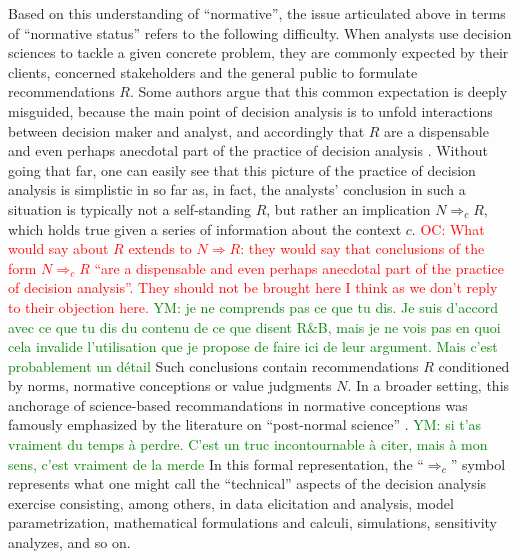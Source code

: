 \documentclass[preprint, french, english, 11pt, authoryear]{elsarticle}%
\newcommand{\commentYM}[1]{\textcolor{green}{YM: #1}}
\newcommand{\commentOC}[1]{\textcolor{red}{OC: #1}}
\newcommand{\commentOCf}[1]{\textcolor{red}{\selectlanguage{french}{OC : #1}}}
\begin{document}
Based on this understanding of “normative”, the issue articulated above in terms of “normative status” refers to the following difficulty. When analysts use decision sciences to tackle a given concrete problem, they are commonly expected by their clients, concerned stakeholders and the general public to formulate recommendations $R$. Some authors argue that this common expectation is deeply misguided, because the main point of decision analysis is to unfold interactions between decision maker and analyst, and accordingly that $R$ are a dispensable and even perhaps anecdotal part of the practice of decision analysis \citep{roy_aide_1993}. Without going that far, one can easily see that this picture of the practice of decision analysis is simplistic in so far as, in fact, the analysts' conclusion in such a situation is typically not a self-standing $R$, but rather an implication $N ⇒_c R$, which holds true given a series of information about the context $c$. 
\commentOC{What \citeauthor{roy_aide_1993} would say about $R$ extends to $N ⇒ R$: they would say that conclusions of the form $N ⇒_c R$ “are a dispensable and even perhaps anecdotal part of the practice of decision analysis”. They should not be brought here I think as we don’t reply to their objection here.} \commentYM{je ne comprends pas ce que tu dis. Je suis d'accord avec ce que tu dis du contenu de ce que disent R\&B, mais je ne vois pas en quoi cela invalide l'utilisation que je propose de faire ici de leur argument. Mais c'est probablement un détail}
Such conclusions contain recommendations $R$ conditioned by norms, normative conceptions or value judgments $N$. In a broader setting, this anchorage of science-based recommandations in normative conceptions was famously emphasized by the literature on ``post-normal science'' \citep{funtowicz_science_1995}. 
\commentOCf{Note pour moi-même : à lire.}\commentYM{si t'as vraiment du temps à perdre. C'est un truc incontournable à citer, mais à mon sens, c'est vraiment de la merde}
In this formal representation, the “$⇒_c $” symbol represents what one might call the “technical” aspects of the decision analysis exercise consisting, among others, in data elicitation and analysis, model parametrization, mathematical formulations and calculi, simulations, sensitivity analyzes, and so on.
\end{document}
